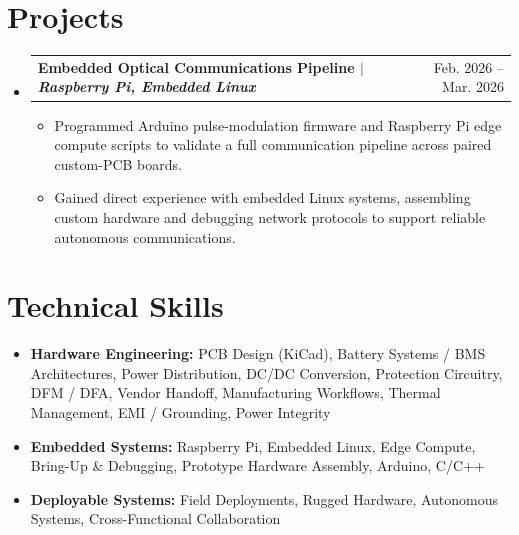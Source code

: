 \documentclass[letterpaper,11pt]{article}
\makeatletter
\newcommand{\resumeItem}[1]{\item{#1}}
\newcommand{\resumeProjectHeading}[2]{
  \item
    \begin{tabular*}{0.97\textwidth}[t]{l@{\extracolsep{\fill}}r}
      \textbf{#1} & #2 \\
    \end{tabular*}
}
\newcommand{\resumeSubHeadingListStart}{\begin{itemize}[label=\textbullet]}
\newcommand{\resumeSubHeadingListEnd}{\end{itemize}}
\newcommand{\resumeItemListStart}{\begin{itemize}[label=-]}
\newcommand{\resumeItemListEnd}{\end{itemize}}
\makeatother
\begin{document}
\section{Projects}
\resumeSubHeadingListStart
  \resumeProjectHeading{Embedded Optical Communications Pipeline $\vert$ \emph{Raspberry Pi, Embedded Linux}}{Feb. 2026 -- Mar. 2026}
  \resumeItemListStart
    \resumeItem{Programmed Arduino pulse-modulation firmware and Raspberry Pi edge compute scripts to validate a full communication pipeline across paired custom-PCB boards.}
    \resumeItem{Gained direct experience with embedded Linux systems, assembling custom hardware and debugging network protocols to support reliable autonomous communications.}
  \resumeItemListEnd
\resumeSubHeadingListEnd

\section{Technical Skills}
\resumeSubHeadingListStart
  \item{\textbf{Hardware Engineering:} PCB Design (KiCad), Battery Systems / BMS Architectures, Power Distribution, DC/DC Conversion, Protection Circuitry, DFM / DFA, Vendor Handoff, Manufacturing Workflows, Thermal Management, EMI / Grounding, Power Integrity}
  \item{\textbf{Embedded Systems:} Raspberry Pi, Embedded Linux, Edge Compute, Bring-Up \& Debugging, Prototype Hardware Assembly, Arduino, C/C++}
  \item{\textbf{Deployable Systems:} Field Deployments, Rugged Hardware, Autonomous Systems, Cross-Functional Collaboration}
\resumeSubHeadingListEnd
\end{document}
